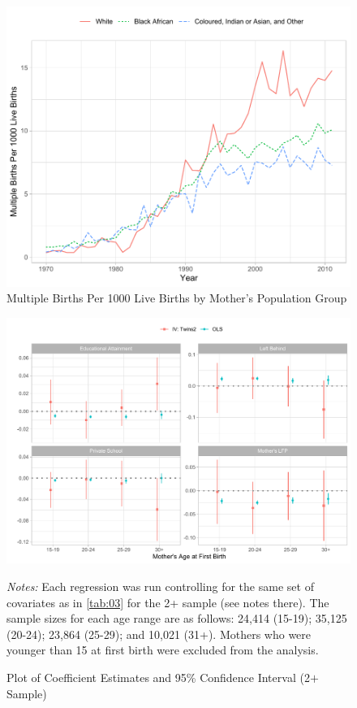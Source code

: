 \documentclass[11pt,a4paper]{article}
\newcommand\fnote[1]{\captionsetup{font=footnotesize}\caption*{#1}}
\begin{document}
\begin{figure}[h!]
\centering
\caption{\label{fig:04}Multiple Births Per 1000 Live Births by Mother's Population Group}
\includegraphics[width=\textwidth]{figures/line_pp.pdf}
\end{figure}

\begin{figure}[h!]
\centering
\caption{\label{fig:05}Plot of Coefficient Estimates and 95\% Confidence Interval (2$ + $ Sample)}
\includegraphics[width=\textwidth]{figures/age_mods.pdf}
\fnote{\textit{Notes:} Each regression was run controlling for the same set of covariates as in \autoref{tab:03} for the 2+ sample (see notes there). The sample sizes for each age range are as follows: 24,414 (15-19); 35,125 (20-24); 23,864 (25-29); and 10,021 (31+). Mothers who were younger than 15 at first birth were excluded from the analysis.}
\end{figure}
\end{document}
